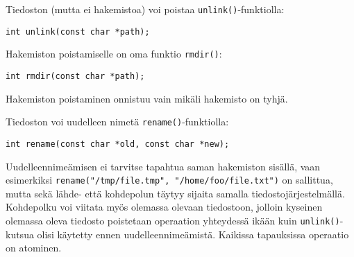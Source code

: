 %
%

Tiedoston (mutta ei hakemistoa) voi poistaa \texttt{unlink()}-funktiolla:
\begin{verbatim}
int unlink(const char *path);
\end{verbatim}

Hakemiston poistamiselle on oma funktio \texttt{rmdir()}:

\begin{verbatim}
int rmdir(const char *path);
\end{verbatim}
Hakemiston poistaminen onnistuu vain mikäli hakemisto on tyhjä.

Tiedoston voi uudelleen nimetä \texttt{rename()}-funktiolla:
\begin{verbatim}
int rename(const char *old, const char *new);
\end{verbatim}

Uudelleennimeämisen ei tarvitse tapahtua saman hakemiston sisällä,
vaan esimerkiksi \texttt{rename("/tmp/file.tmp", "/home/foo/file.txt")} on sallittua,
mutta sekä lähde- että kohdepolun täytyy sijaita samalla tiedostojärjestelmällä.
Kohdepolku voi viitata myös olemassa olevaan tiedostoon,
jolloin kyseinen olemassa oleva tiedosto poistetaan operaation yhteydessä ikään kuin \texttt{unlink()}-kutsua olisi käytetty ennen uudelleennimeämistä.
Kaikissa tapauksissa operaatio on atominen.

